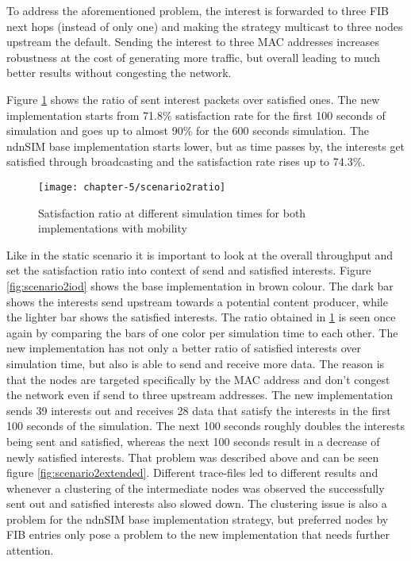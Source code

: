 To address the aforementioned problem, the interest is forwarded to three FIB next hops (instead of only one) and making the strategy multicast to three nodes upstream the default. Sending the interest to three MAC addresses increases robustness at the cost of generating more traffic, but overall leading to much better results without congesting the network.

Figure \ref{fig:scenario2ratio} shows the ratio of sent interest packets over satisfied ones. The new implementation starts from 71.8\% satisfaction rate for the first 100 seconds of simulation and goes up to almost 90\% for the 600 seconds simulation. The ndnSIM base implementation starts lower, but as time passes by, the interests get satisfied through broadcasting and the satisfaction rate rises up to 74.3\%.

\begin{figure}[H]
  \centering
  \texttt{[image: chapter-5/scenario2ratio]}
  \caption{Satisfaction ratio at different simulation times for both implementations with mobility}
  \label{fig:scenario2ratio}
\end{figure}

\vspace{5mm} %

Like in the static scenario it is important to look at the overall throughput and set the satisfaction ratio into context of send and satisfied interests. Figure \ref{fig:scenario2iod} shows the base implementation in brown colour. The dark bar shows the interests send upstream towards a potential content producer, while the lighter bar shows the satisfied interests. The ratio obtained in \ref{fig:scenario2ratio} is seen once again by comparing the bars of one color per simulation time to each other. The new implementation has not only a better ratio of satisfied interests over simulation time, but also is able to send and receive more data. The reason is that the nodes are targeted specifically by the MAC address and don't congest the network even if send to three upstream addresses.
The new implementation sends 39 interests out and receives 28 data that satisfy the interests in the first 100 seconds of the simulation. The next 100 seconds roughly doubles the interests being sent and satisfied, whereas the next 100 seconds result in a decrease of newly satisfied interests. That problem was described above and can be seen figure \ref{fig:scenario2extended}. Different trace-files led to different results and whenever a clustering of the intermediate nodes was observed the successfully sent out and satisfied interests also slowed down. The clustering issue is also a problem for the ndnSIM base implementation strategy, but preferred nodes by FIB entries only pose a problem to the new implementation that needs further attention.

